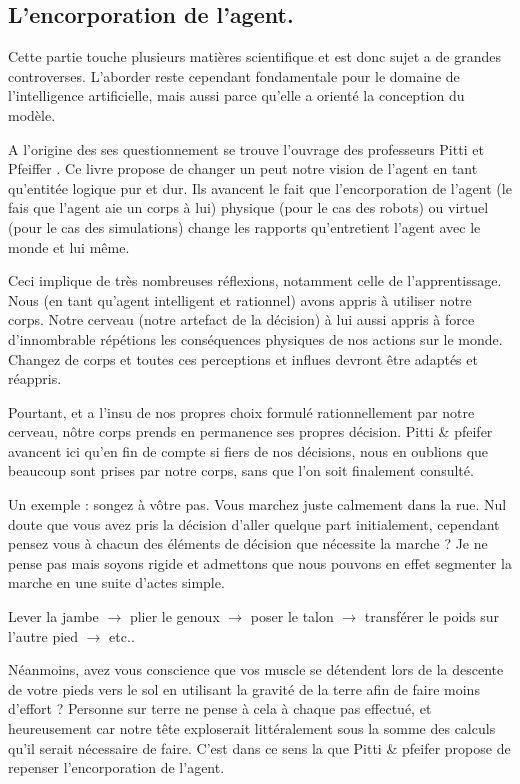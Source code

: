 \documentclass[a4paper,11pt]{article}
\begin{document}
\subsection{L'encorporation de l'agent.}

Cette partie touche plusieurs matières scientifique et est donc sujet a de grandes controverses. L'aborder reste cependant fondamentale pour le domaine de l'intelligence artificielle, mais aussi parce qu'elle a orienté la conception du modèle. 

A l'origine des ses questionnement se trouve l'ouvrage des professeurs Pitti et Pfeiffer \cite{pitti:hal-00763867}. Ce livre propose de changer un peut notre vision de l'agent en tant qu'entitée logique pur et dur. Ils avancent le fait que l'encorporation de l'agent (le fais que l'agent aie un corps à lui) physique (pour le cas des robots) ou virtuel (pour le cas des simulations) change les rapports qu'entretient l'agent avec le monde et lui même. 

Ceci implique de très nombreuses réflexions, notamment celle de l'apprentissage. Nous (en tant qu'agent intelligent et rationnel) avons appris à utiliser notre corps. Notre cerveau (notre artefact de la décision) à lui aussi appris à force d'innombrable répétions les conséquences physiques de nos actions sur le monde.  Changez de corps et toutes ces perceptions et influes devront être adaptés et réappris. 

Pourtant, et a l'insu de nos propres choix formulé rationnellement par notre cerveau, nôtre corps prends en permanence ses propres décision. Pitti \& pfeifer avancent ici qu'en fin de compte si fiers de nos décisions, nous en oublions que beaucoup sont prises par notre corps, sans que l'on soit finalement consulté. 

Un exemple : songez à vôtre pas. Vous marchez juste calmement dans la rue. Nul doute que vous avez pris la décision d'aller quelque part initialement, cependant pensez vous à chacun des éléments de décision que nécessite la marche ? Je ne pense pas mais soyons rigide et admettons que nous pouvons en effet segmenter la marche en une suite d'actes simple. 

Lever la jambe $\rightarrow$ plier le genoux $\rightarrow$ poser le talon $\rightarrow$ transférer le poids sur l'autre pied $\rightarrow$ etc.. 

Néanmoins, avez vous conscience que vos muscle se détendent lors de la descente de votre pieds vers le sol en utilisant la gravité de la terre afin de faire moins d'effort ? Personne sur terre ne pense à cela à chaque pas effectué, et heureusement car notre tête exploserait littéralement sous la somme des calculs qu'il serait nécessaire de faire. C'est dans ce sens la que Pitti \& pfeifer propose de repenser l'encorporation de l'agent. 
\end{document}
